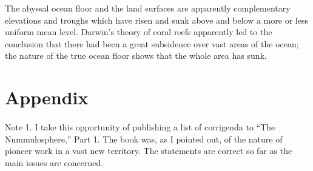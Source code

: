 \documentclass[a4paper, 12pt, oneside]{article}
\begin{document}
The abyssal ocean floor and the land surfaces are apparently complementary elevations and troughs which have risen and sunk above and below a more or less uniform mean level. Darwin's theory of coral reefs apparently led to the conclusion that there had been a great subsidence over vast areas of the ocean; the nature of the true ocean floor shows that the whole area has sunk.
\clearpage
\section{Appendix}
\paragraph{}
Note 1. I take this opportunity of publishing a list of corrigenda to ``The Nummulosphere,'' Part 1. The book was, as I pointed out, of the nature of pioneer work in a vast new territory. The statements are correct so far as the main issues are concerned.
\end{document}
